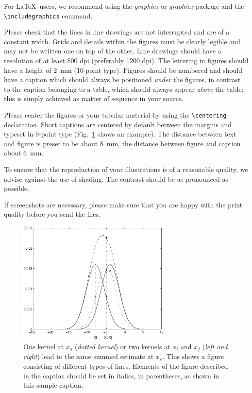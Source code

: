 \documentclass[lnicst,sechang,a4paper]{svmultln}
\begin{document}
For \LaTeX\ users, we recommend using the \emph{graphics} or \emph{graphicx}
package and the \verb+\includegraphics+ command.

Please check that the lines in line drawings are not
interrupted and are of a constant width. Grids and details within the
figures must be clearly legible and may not be written one on top of
the other. Line drawings should have a resolution of at least 800 dpi
(preferably 1200 dpi). The lettering in figures should have a height of
2~mm (10-point type). Figures should be numbered and should have a
caption which should always be positioned \emph{under} the figures, in
contrast to the caption belonging to a table, which should always appear
\emph{above} the table; this is simply achieved as matter of sequence in
your source.

Please center the figures or your tabular material by using the \verb+\centering+
declaration. Short captions are centered by default between the margins
and typeset in 9-point type (Fig.~\ref{fig:example} shows an example).
The distance between text and figure is preset to be about 8~mm, the
distance between figure and caption about 6~mm.

To ensure that the reproduction of your illustrations is of a reasonable
quality, we advise against the use of shading. The contrast should be as
pronounced as possible.

If screenshots are necessary, please make sure that you are happy with
the print quality before you send the files.
\begin{figure}
\centering
\includegraphics[height=6.2cm]{eijkel2}
\caption{One kernel at $x_s$ (\emph{dotted kernel}) or two kernels at
$x_i$ and $x_j$ (\textit{left and right}) lead to the same summed estimate
at $x_s$. This shows a figure consisting of different types of
lines. Elements of the figure described in the caption should be set in
italics, in parentheses, as shown in this sample caption.}
\label{fig:example}
\end{figure}
\end{document}
